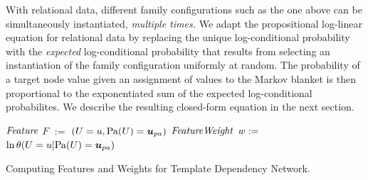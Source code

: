 \documentclass[runningheads,a4paper]{llncs}
\begin{document}
With relational data, different family configurations such as the one above can be simultaneously instantiated, {\em multiple times.}  We adapt the propositional log-linear equation for relational data by replacing the unique log-conditional probability with the {\em expected} log-conditional probability that results from selecting an instantiation of the family configuration uniformly at random. The probability of a target node value given an assignment of values to the Markov blanket is then proportional to the exponentiated sum of the expected log-conditional probabilites. %
We describe the resulting closed-form equation in the next section.




\begin{algorithm}[htbp]
{}
\begin{algorithmic}[1]
			\STATE $\it{Feature}$ $F$  $:=$ $(\Appendterm{\UT  = \UV} {\Pa{\UT} = \Prange{\UT}})$ 
			\STATE  $\it{FeatureWeight} $ $w:=$ $\ln\cprob{\UT = \UV}{\Pa{\UT} = \Prange{\UT}}$
			\ENDIF \\	
		\ENDFOR
	\ENDFOR
\ENDFOR 
\ENDFOR
\STATE {}
\end{algorithmic}
\caption{Computing Features and Weights for Template Dependency Network. \label{alg:dnfeatures}
}
\end{algorithm}
\end{document}
